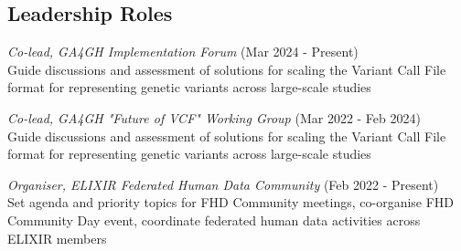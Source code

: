 \documentclass[margin,line]{res}
\begin{document}
\begin{resume}


\section{\sc Leadership Roles}
{\em Co-lead, GA4GH Implementation Forum} (Mar 2024 - Present)\\
Guide discussions and assessment of solutions for scaling the Variant Call File format for representing genetic variants across large-scale studies

{\em Co-lead, GA4GH "Future of VCF" Working Group} (Mar 2022 - Feb 2024)\\
Guide discussions and assessment of solutions for scaling the Variant Call File format for representing genetic variants across large-scale studies

{\em Organiser, ELIXIR Federated Human Data Community} (Feb 2022 - Present)\\
Set agenda and priority topics for FHD Community meetings, co-organise FHD Community Day event, coordinate federated human data activities across ELIXIR members


\end{resume}
\end{document}
